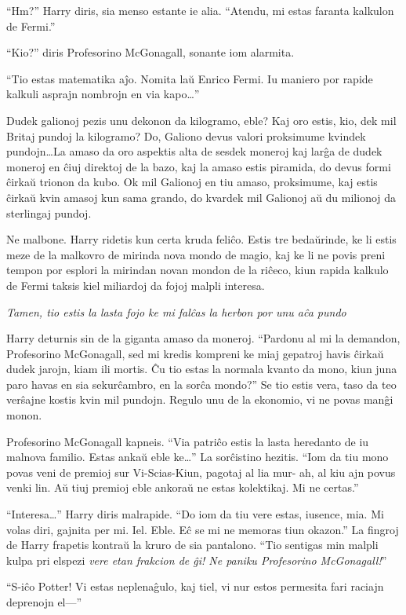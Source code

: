 ``Hm?'' Harry diris, sia menso estante ie alia. ``Atendu, mi estas
faranta kalkulon de Fermi.''

``Kio?'' diris Profesorino McGonagall, sonante iom alarmita.

``Tio estas matematika aĵo. Nomita laŭ Enrico Fermi. Iu maniero por rapide kalkuli
asprajn nombrojn en via kapo\ldots''

Dudek galionoj pezis unu dekonon da kilogramo, eble? Kaj oro estis,
kio, dek mil Britaj pundoj la kilogramo? Do, Galiono devus valori
proksimume kvindek pundojn\ldots La amaso da oro aspektis alta de
sesdek moneroj kaj larĝa de dudek moneroj en ĉiuj direktoj de la bazo,
kaj la amaso estis piramida, do devus formi ĉirkaŭ trionon da kubo. Ok
mil Galionoj en tiu amaso, proksimume, kaj estis ĉirkaŭ kvin amasoj
kun sama grando, do kvardek mil Galionoj aŭ du milionoj da sterlingaj
pundoj.

Ne malbone. Harry ridetis kun certa kruda feliĉo. Estis tre
bedaŭrinde, ke li estis meze de la malkovro de mirinda nova mondo de
magio, kaj ke li ne povis preni tempon por esplori la mirindan novan
mondon de la riĉeco, kiun rapida kalkulo de Fermi taksis kiel
miliardoj da fojoj malpli interesa.

\emph {Tamen, tio estis la lasta fojo ke mi falĉas la herbon por unu
  aĉa pundo}

Harry deturnis sin de la giganta amaso da moneroj. ``Pardonu al mi la
demandon, Profesorino McGonagall, sed mi kredis kompreni ke miaj
gepatroj havis ĉirkaŭ dudek jarojn, kiam ili mortis. Ĉu tio estas la
normala kvanto da mono, kiun juna paro havas en sia sekurĉambro, en la
sorĉa mondo?'' Se tio estis vera, taso da teo verŝajne kostis kvin mil
pundojn. Regulo unu de la ekonomio, vi ne povas manĝi monon.

Profesorino McGonagall kapneis. ``Via patriĉo estis la lasta heredanto
de iu malnova familio. Estas ankaŭ eble ke\ldots'' La sorĉistino
hezitis. ``Iom da tiu mono povas veni de premioj sur Vi-Scias-Kiun,
pagotaj al lia mur- ah, al kiu ajn povus venki lin. Aŭ tiuj premioj
eble ankoraŭ ne estas kolektikaj. Mi ne certas.''

``Interesa\ldots'' Harry diris malrapide. ``Do iom da tiu vere estas,
iusence, mia. Mi volas diri, gajnita per mi. Iel. Eble. Eĉ se mi ne
memoras tiun okazon.'' La fingroj de Harry frapetis kontraŭ la kruro
de sia pantalono. ``Tio sentigas min malpli kulpa pri elspezi
\emph{vere etan frakcion de ĝi! Ne paniku Profesorino McGonagall!}''

``S-iĉo Potter! Vi estas neplenaĝulo, kaj tiel, vi nur estos permesita
fari raciajn deprenojn el—''

